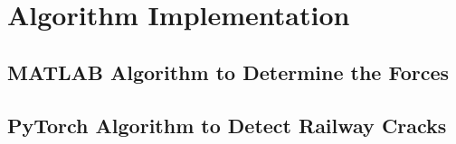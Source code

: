 \section{Algorithm Implementation}

\subsection{MATLAB Algorithm to Determine the Forces}

\subsection{PyTorch Algorithm to Detect Railway Cracks}